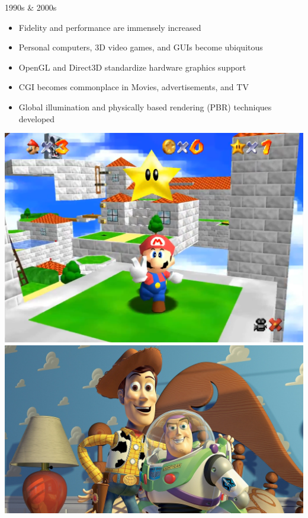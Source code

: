 \documentclass{lug}
\newcommand{\splitslide}[4]{
    \noindent
    \begin{minipage}{#1 \textwidth - #2 }
        #3
    \end{minipage}%
    \hspace{ \dimexpr #2 * 2 \relax }%
    \begin{minipage}{\textwidth - #1 \textwidth - #2 }
        #4
    \end{minipage}
}
\begin{document}
\begin{frame}{1990s \& 2000s}
    \splitslide{0.65}{.7em}{
        \small
        \begin{itemize}
            \item Fidelity and performance are immensely increased
            \item Personal computers, 3D video games, and GUIs become ubiquitous
            \item OpenGL and Direct3D standardize hardware graphics support
            \item CGI becomes commonplace in Movies, advertisements, and TV 
            \item Global illumination and physically based rendering (PBR) techniques developed
        \end{itemize}
    }{
        \includegraphics[width=\textwidth]{graphics/supermario64} \\
        \includegraphics[width=\textwidth]{graphics/toy_story} \\
}
\end{frame}
\end{document}
